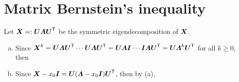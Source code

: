 \section{Matrix Bernstein’s inequality}
\begin{problem*}[Exercise 5.4.3]\label{ex5.4.3}

\end{problem*}
\begin{answer}
Let $\BM X=:\BM U\BM\varLambda\BM U\Tp$ be the symmetric eigendecomposition of $\BM X$. 

\begin{enumerate}[(a)]
\item
Since $\BM X^k=\BM U\BM\varLambda\BM U\Tp\cdots\BM U\BM\varLambda\BM U\Tp=\BM U\BM\varLambda\BM I\cdots\BM I\BM\varLambda\BM U\Tp=\BM U\BM\varLambda^k\BM U\Tp$ for all $k\ge0$, then
\item
Since $\BM X-x_0\BM I=\BM U(\BM\varLambda-x_0\BM I)\BM U\Tp$, then by (a),
\end{enumerate}
\end{answer}

